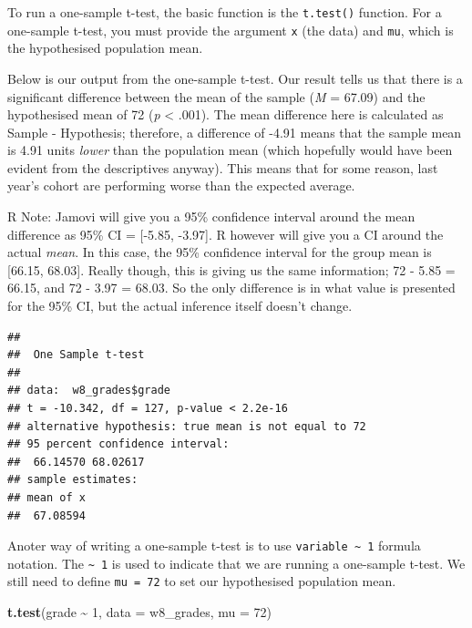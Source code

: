 \documentclass[
]{book}
\newenvironment{Shaded}{\begin{snugshade}}{\end{snugshade}}
\newcommand{\AttributeTok}[1]{\textcolor[rgb]{0.13,0.29,0.53}{#1}}
\newcommand{\DecValTok}[1]{\textcolor[rgb]{0.00,0.00,0.81}{#1}}
\newcommand{\FunctionTok}[1]{\textcolor[rgb]{0.13,0.29,0.53}{\textbf{#1}}}
\newcommand{\NormalTok}[1]{#1}
\newcommand{\SpecialCharTok}[1]{\textcolor[rgb]{0.81,0.36,0.00}{\textbf{#1}}}
\begin{document}
To run a one-sample t-test, the basic function is the \texttt{t.test()} function. For a one-sample t-test, you must provide the argument \texttt{x} (the data) and \texttt{mu}, which is the hypothesised population mean.

Below is our output from the one-sample t-test. Our result tells us that there is a significant difference between the mean of the sample (\emph{M} = 67.09) and the hypothesised mean of 72 (\emph{p} \textless{} .001). The mean difference here is calculated as Sample - Hypothesis; therefore, a difference of -4.91 means that the sample mean is 4.91 units \emph{lower} than the population mean (which hopefully would have been evident from the descriptives anyway). This means that for some reason, last year's cohort are performing worse than the expected average.

R Note: Jamovi will give you a 95\% confidence interval around the mean difference as 95\% CI = {[}-5.85, -3.97{]}. R however will give you a CI around the actual \emph{mean}. In this case, the 95\% confidence interval for the group mean is {[}66.15, 68.03{]}. Really though, this is giving us the same information; 72 - 5.85 = 66.15, and 72 - 3.97 = 68.03. So the only difference is in what value is presented for the 95\% CI, but the actual inference itself doesn't change.

\begin{Shaded}
\end{Shaded}

\begin{verbatim}
## 
##  One Sample t-test
## 
## data:  w8_grades$grade
## t = -10.342, df = 127, p-value < 2.2e-16
## alternative hypothesis: true mean is not equal to 72
## 95 percent confidence interval:
##  66.14570 68.02617
## sample estimates:
## mean of x 
##  67.08594
\end{verbatim}

Anoter way of writing a one-sample t-test is to use \texttt{variable\ \textasciitilde{}\ 1} formula notation. The \texttt{\textasciitilde{}\ 1} is used to indicate that we are running a one-sample t-test. We still need to define \texttt{mu\ =\ 72} to set our hypothesised population mean.

\begin{Shaded}
\begin{Highlighting}[]
\FunctionTok{t.test}\NormalTok{(grade }\SpecialCharTok{\textasciitilde{}} \DecValTok{1}\NormalTok{, }\AttributeTok{data =}\NormalTok{ w8\_grades, }\AttributeTok{mu =} \DecValTok{72}\NormalTok{)}
\end{Highlighting}
\end{Shaded}
\end{document}
